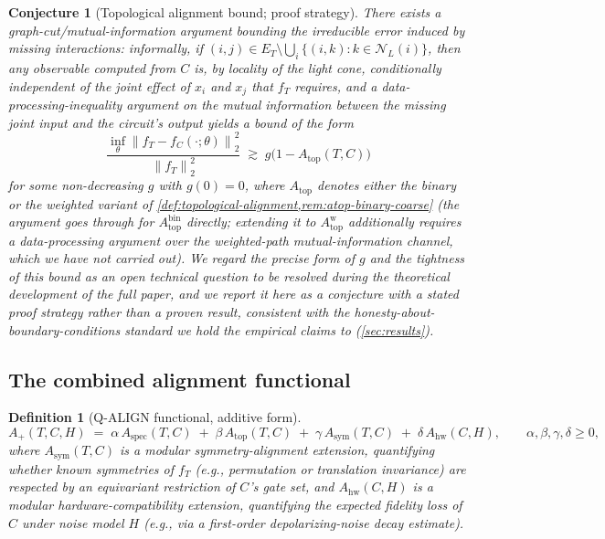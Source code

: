 \documentclass[11pt]{article}
\newtheorem{definition}[theorem]{Definition}
\newtheorem{conjecture}[theorem]{Conjecture}
\newcommand{\Aspec}{A_{\mathrm{spec}}}
\newcommand{\Atop}{A_{\mathrm{top}}}
\newcommand{\Asym}{A_{\mathrm{sym}}}
\newcommand{\Ahw}{A_{\mathrm{hw}}}
\newcommand{\norm}[1]{\left\lVert #1 \right\rVert}
\newcommand{\fT}{f_T}
\newcommand{\fC}{f_C}
\begin{document}
\begin{conjecture}[Topological alignment bound; proof strategy]
\label{conj:topological-bound}
There exists a graph-cut/mutual-information argument bounding the irreducible error induced by missing interactions: informally, if $(i,j) \in E_T \setminus \bigcup_i \{(i,k): k \in \mathcal{N}_L(i)\}$, then any observable computed from $C$ is, by locality of the light cone, conditionally independent of the joint effect of $x_i$ and $x_j$ that $\fT$ requires, and a data-processing-inequality argument on the mutual information between the missing joint input and the circuit's output yields a bound of the form
\[
    \frac{\inf_\theta \norm{\fT - \fC(\cdot;\theta)}_2^2}{\norm{\fT}_2^2} \;\gtrsim\; g\big(1 - \Atop(T,C)\big)
\]
for some non-decreasing $g$ with $g(0)=0$, where $\Atop$ denotes either the binary or the weighted variant of \cref{def:topological-alignment,rem:atop-binary-coarse} (the argument goes through for $\Atop^{\mathrm{bin}}$ directly; extending it to $\Atop^{\mathrm{w}}$ additionally requires a data-processing argument over the weighted-path mutual-information channel, which we have not carried out). We regard the precise form of $g$ and the tightness of this bound as an open technical question to be resolved during the theoretical development of the full paper, and we report it here as a conjecture with a stated proof strategy rather than a proven result, consistent with the honesty-about-boundary-conditions standard we hold the empirical claims to (\cref{sec:results}).
\end{conjecture}

\subsection{The combined alignment functional}
\label{sec:combined-functional}

\begin{definition}[Q-ALIGN functional, additive form]
\label{def:qalign}
\[
    A_{+}(T,C,H) \;=\; \alpha\, \Aspec(T,C) \;+\; \beta\, \Atop(T,C) \;+\; \gamma\, \Asym(T,C) \;+\; \delta\, \Ahw(C,H), \qquad \alpha,\beta,\gamma,\delta \geq 0,
\]
where $\Asym(T,C)$ is a modular \emph{symmetry-alignment} extension, quantifying whether known symmetries of $\fT$ (e.g., permutation or translation invariance) are respected by an equivariant restriction of $C$'s gate set, and $\Ahw(C,H)$ is a modular \emph{hardware-compatibility} extension, quantifying the expected fidelity loss of $C$ under noise model $H$ (e.g., via a first-order depolarizing-noise decay estimate).
\end{definition}
\end{document}
